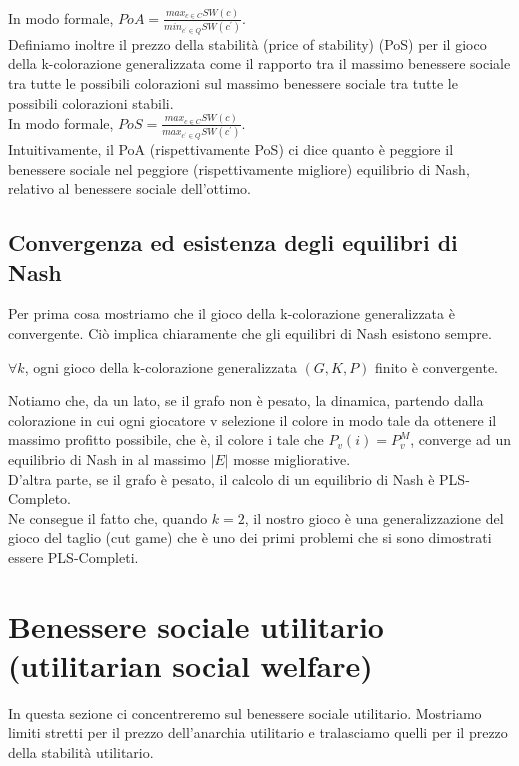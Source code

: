 In modo formale, \(PoA = \frac{max_{c \in C} SW(c)}{min_{c^{\prime} \in Q} SW(c^{\prime})}\).\\

Definiamo inoltre il prezzo della stabilità (price of stability) (PoS) per il gioco della k-colorazione generalizzata come il rapporto tra il massimo benessere sociale tra tutte le possibili colorazioni sul massimo benessere sociale tra tutte le possibili colorazioni stabili.\\
In modo formale, \(PoS = \frac{max_{c \in C} SW(c)}{max_{c^{\prime} \in Q} SW(c^{\prime})}\).\\

Intuitivamente, il PoA (rispettivamente PoS) ci dice quanto è peggiore il benessere sociale nel peggiore (rispettivamente migliore) equilibrio di Nash, relativo al benessere sociale dell'ottimo.\\

\subsection{Convergenza ed esistenza degli equilibri di Nash}
\justify
Per prima cosa mostriamo che il gioco della k-colorazione generalizzata è convergente. Ciò implica chiaramente che gli equilibri di Nash esistono sempre.\\

\begin{prop}
\label{proposition1}
	\(\forall k\), ogni gioco della k-colorazione generalizzata \((G, K, P)\) finito è convergente.
\end{prop}

Notiamo che, da un lato, se il grafo non è pesato, la dinamica, partendo dalla colorazione in cui ogni giocatore v selezione il colore in modo tale da ottenere il massimo profitto possibile, che è, il colore i tale che \(P_v (i) = P_v^M\), converge ad un equilibrio di Nash in al massimo \(|E|\) mosse migliorative.\\

D'altra parte, se il grafo è pesato, il calcolo di un equilibrio di Nash è PLS-Completo.\\

Ne consegue il fatto che, quando \(k = 2\), il nostro gioco è una generalizzazione del gioco del taglio (cut game) che è uno dei primi problemi che si sono dimostrati essere PLS-Completi.\\

\section{Benessere sociale utilitario (utilitarian social welfare)}
\justify
In questa sezione ci concentreremo sul benessere sociale utilitario. Mostriamo limiti stretti per il prezzo dell'anarchia utilitario e tralasciamo quelli per il prezzo della stabilità utilitario.\\

